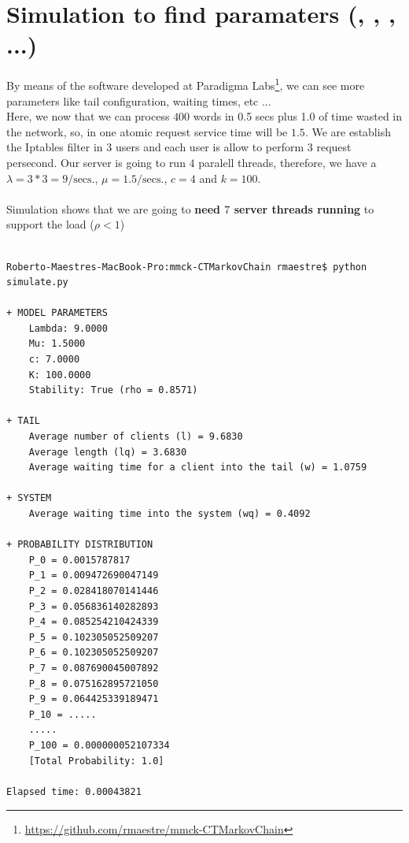 \documentclass[a4paper,11pt]{article}
\begin{document}
 \section{Simulation to find paramaters (\lambda, \mu, \rho, ...) }
By means of the software developed at Paradigma Labs\footnote{\url{https://github.com/rmaestre/mmck-CTMarkovChain}}, we can see more parameters like tail configuration, waiting times, etc ...
\\
Here, we now that we can process $400$ words in 0.5 secs plus 1.0 of time wasted in the network, so, in one atomic request service time will be $1.5$. We are establish the Iptables filter in 3 users and each user is allow to perform 3 request persecond. Our server is going to run $4$ paralell threads, therefore, we have a $\lambda = 3 * 3 = 9 / \text{secs}.$, $\mu = 1.5 / \text{secs}.$, $c=4$ and $k = 100$. 
\\
\\
Simulation shows that we are going to {\bf need $7$ server threads running} to support the load ($\rho < 1$)

\begin{verbatim}

Roberto-Maestres-MacBook-Pro:mmck-CTMarkovChain rmaestre$ python simulate.py 

+ MODEL PARAMETERS
	Lambda: 9.0000
	Mu: 1.5000
	c: 7.0000
	K: 100.0000
	Stability: True (rho = 0.8571)

+ TAIL
	Average number of clients (l) = 9.6830
	Average length (lq) = 3.6830
	Average waiting time for a client into the tail (w) = 1.0759

+ SYSTEM
	Average waiting time into the system (wq) = 0.4092

+ PROBABILITY DISTRIBUTION
	P_0 = 0.0015787817
	P_1 = 0.009472690047149
	P_2 = 0.028418070141446
	P_3 = 0.056836140282893
	P_4 = 0.085254210424339
	P_5 = 0.102305052509207
	P_6 = 0.102305052509207
	P_7 = 0.087690045007892
	P_8 = 0.075162895721050
	P_9 = 0.064425339189471
	P_10 = ..... 
	..... 
	P_100 = 0.000000052107334
	[Total Probability: 1.0]

Elapsed time: 0.00043821
\end{verbatim}




 


\newpage
\end{document}
